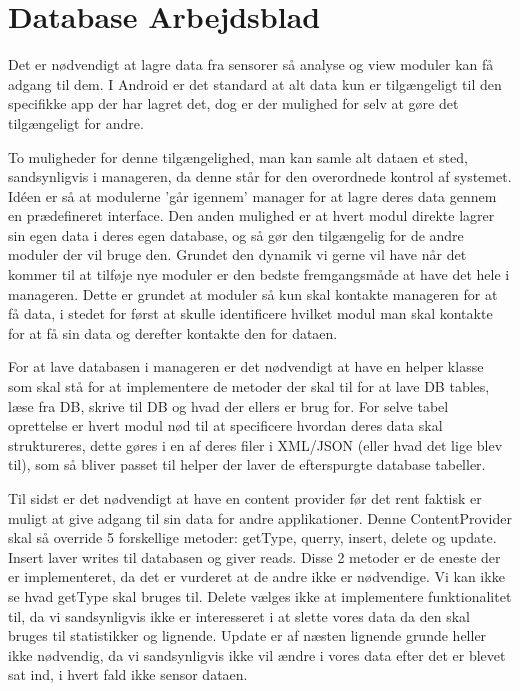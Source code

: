 \chapter{Database Arbejdsblad}
Det er nødvendigt at lagre data fra sensorer så analyse og view moduler kan få adgang til dem.
I Android er det standard at alt data kun er tilgængeligt til den specifikke app der har lagret det, dog er der mulighed for selv at gøre det tilgængeligt for andre.

To muligheder for denne tilgængelighed, man kan samle alt dataen et sted, sandsynligvis i manageren, da denne står for den overordnede kontrol af systemet. Idéen er så at modulerne 'går igennem' manager for at lagre deres data gennem en prædefineret interface.
Den anden mulighed er at hvert modul direkte lagrer sin egen data i deres egen database, og så gør den tilgængelig for de andre moduler der vil bruge den.
Grundet den dynamik vi gerne vil have når det kommer til at tilføje nye moduler er den bedste fremgangsmåde at have det hele i manageren.
Dette er grundet at moduler så kun skal kontakte manageren for at få data, i stedet for først at skulle identificere hvilket modul man skal kontakte for at få sin data og derefter kontakte den for dataen.

For at lave databasen i manageren er det nødvendigt at have en helper klasse som skal stå for at implementere de metoder der skal til for at lave DB tables, læse fra DB, skrive til DB og hvad der ellers er brug for.
For selve tabel oprettelse er hvert modul nød til at specificere hvordan deres data skal struktureres, dette gøres i en af deres filer i XML/JSON (eller hvad det lige blev til), som så bliver passet til helper der laver de efterspurgte database tabeller. 

Til sidst er det nødvendigt at have en content provider før det rent faktisk er muligt at give adgang til sin data for andre applikationer.
Denne ContentProvider skal så override 5 forskellige metoder:  getType, querry, insert, delete og update.
Insert laver writes til databasen og giver reads.
Disse 2 metoder er de eneste der er implementeret, da det er vurderet at de andre ikke er nødvendige.
Vi kan ikke se hvad getType skal bruges til.
Delete vælges ikke at implementere funktionalitet til, da vi sandsynligvis ikke er interesseret i at slette vores data da den skal bruges til statistikker og lignende.
Update er af næsten lignende grunde heller ikke nødvendig, da vi sandsynligvis ikke vil ændre i vores data efter det er blevet sat ind, i hvert fald ikke sensor dataen.

